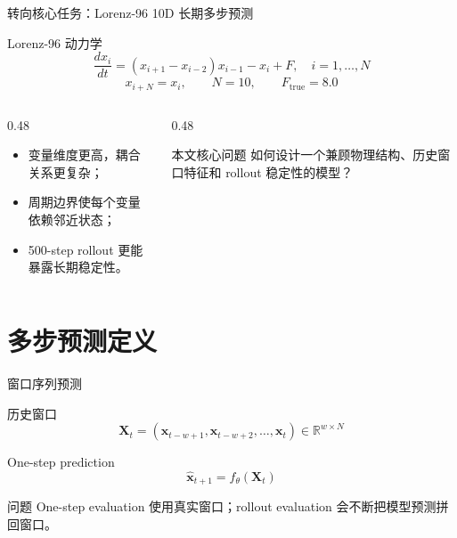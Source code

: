 \documentclass[UTF8,aspectratio=169,11pt]{ctexbeamer}
\newcommand{\xvec}{\mathbf{x}}
\newcommand{\Xwin}{\mathbf{X}}
\begin{document}
\begin{frame}{转向核心任务：Lorenz-96 10D 长期多步预测}
    \begin{block}{Lorenz-96 动力学}
        \[
        \frac{dx_i}{dt}=(x_{i+1}-x_{i-2})x_{i-1}-x_i+F,\quad i=1,\dots,N
        \]
        \[
        x_{i+N}=x_i,\qquad N=10,\qquad F_{\mathrm{true}}=8.0
        \]
    \end{block}
    \begin{columns}[T,onlytextwidth]
        \begin{column}{0.48\textwidth}
            \begin{itemize}
                \item 变量维度更高，耦合关系更复杂；
                \item 周期边界使每个变量依赖邻近状态；
                \item 500-step rollout 更能暴露长期稳定性。
            \end{itemize}
        \end{column}
        \begin{column}{0.48\textwidth}
            \begin{alertblock}{本文核心问题}
                如何设计一个兼顾物理结构、历史窗口特征和 rollout 稳定性的模型？
            \end{alertblock}
        \end{column}
    \end{columns}
\end{frame}

\section{多步预测定义}

\begin{frame}{窗口序列预测}
    \begin{block}{历史窗口}
        \[
        \Xwin_t=(\xvec_{t-w+1},\xvec_{t-w+2},\dots,\xvec_t)\in \mathbb{R}^{w\times N}
        \]
    \end{block}
    \begin{block}{One-step prediction}
        \[
        \hat{\xvec}_{t+1}=f_\theta(\Xwin_t)
        \]
    \end{block}
    \begin{alertblock}{问题}
        One-step evaluation 使用真实窗口；rollout evaluation 会不断把模型预测拼回窗口。
    \end{alertblock}
\end{frame}
\end{document}
